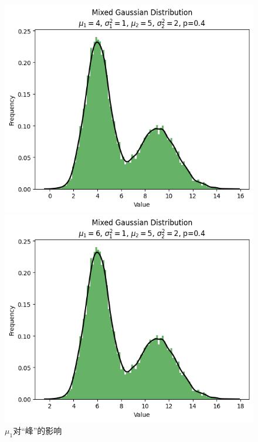 \documentclass{article}
\begin{document}
\begin{figure}[H]
    \hfill
    \begin{minipage}[b]{0.3\linewidth}
        \centering
        \includegraphics[width=\linewidth]{figure/mu_1=4.png}
        \caption{$\mu_1=4$}
    \end{minipage}
    \hfill
    \begin{minipage}[b]{0.3\linewidth}
        \centering
        \includegraphics[width=\linewidth]{figure/mu_1=6.png}
        \caption{$\mu_1=6$}
    \end{minipage}
    \caption{$\mu_1$对“峰”的影响}
    \label{fig:mu1}
\end{figure}
\end{document}
